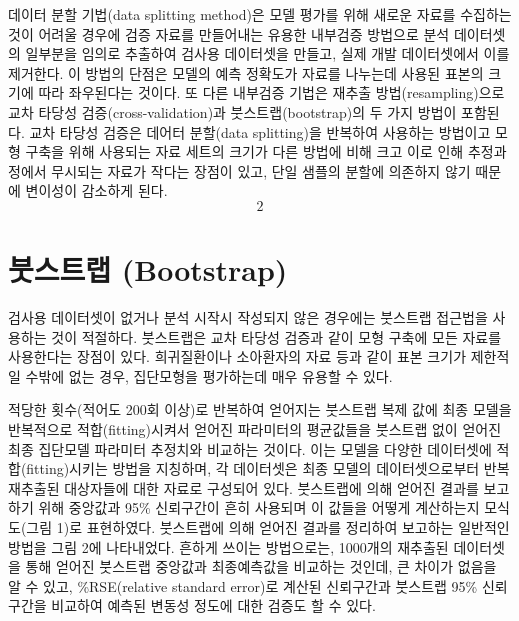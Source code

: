 \documentclass[
  10pt,
]{krantz}
\begin{document}
데이터 분할 기법(data splitting method)은 모델 평가를 위해 새로운 자료를 수집하는 것이 어려울 경우에 검증
자료를 만들어내는 유용한 내부검증 방법으로 분석 데이터셋의 일부분을 임의로 추출하여 검사용 데이터셋을 만들고, 실제 개발
데이터셋에서 이를 제거한다. 이 방법의 단점은 모델의 예측 정확도가 자료를 나누는데 사용된 표본의 크기에 따라 좌우된다는
것이다. 또 다른 내부검증 기법은 재추출 방법(resampling)으로 교차 타당성
검증(cross-validation)과 붓스트랩(bootstrap)의 두 가지 방법이 포함된다. 교차 타당성 검증은 데어터
분할(data splitting)을 반복하여 사용하는 방법이고 모형 구축을 위해 사용되는 자료 세트의 크기가 다른 방법에 비해
크고 이로 인해 추정과정에서 무시되는 자료가 작다는 장점이 있고, 단일 샘플의 분할에 의존하지 않기 때문에 변이성이
감소하게 된다. \[2\]

\hypertarget{uxbd93uxc2a4uxd2b8uxb7a9-bootstrap}{%
\section{붓스트랩 (Bootstrap)}\label{uxbd93uxc2a4uxd2b8uxb7a9-bootstrap}}

검사용 데이터셋이 없거나 분석 시작시 작성되지 않은 경우에는 붓스트랩 접근법을 사용하는 것이 적절하다. 붓스트랩은 교차 타당성
검증과 같이 모형 구축에 모든 자료를 사용한다는 장점이 있다. 희귀질환이나 소아환자의 자료 등과 같이 표본 크기가 제한적일
수밖에 없는 경우, 집단모형을 평가하는데 매우 유용할 수 있다.

적당한 횟수(적어도 200회 이상)로 반복하여 얻어지는 붓스트랩 복제 값에 최종 모델을 반복적으로 적합(fitting)시켜서
얻어진 파라미터의 평균값들을 붓스트랩 없이 얻어진 최종 집단모델 파라미터 추정치와 비교하는 것이다. 이는 모델을 다양한
데이터셋에 적합(fitting)시키는 방법을 지칭하며, 각 데이터셋은 최종 모델의 데이터셋으로부터 반복 재추출된 대상자들에 대한
자료로 구성되어 있다. 붓스트랩에 의해 얻어진 결과를 보고하기 위해 중앙값과 95\% 신뢰구간이 흔히 사용되며 이 값들을 어떻게
계산하는지 모식도(그림 1)로 표현하였다. 붓스트랩에 의해 얻어진 결과를 정리하여 보고하는 일반적인 방법을 그림 2에 나타내었다.
흔하게 쓰이는 방법으로는, 1000개의 재추출된 데이터셋을 통해 얻어진 붓스트랩 중앙값과 최종예측값을 비교하는 것인데, 큰 차이가
없음을 알 수 있고, \%RSE(relative standard error)로 계산된 신뢰구간과 붓스트랩 95\% 신뢰구간을 비교하여
예측된 변동성 정도에 대한 검증도 할 수 있다.
\end{document}

